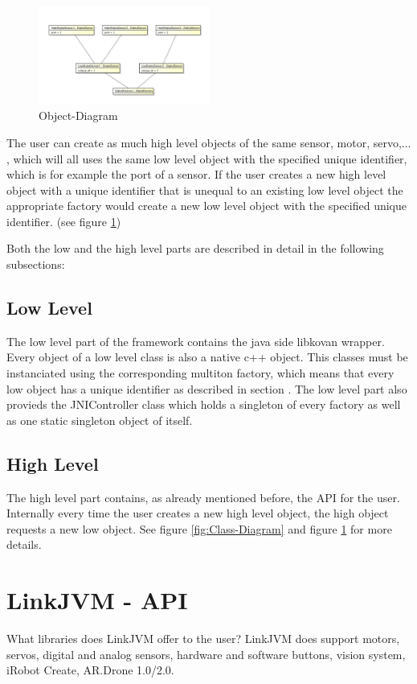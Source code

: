 \documentclass{juniorjournal}
\begin{document}
\begin{figure}[htbp]
\centering
\includegraphics[width=0.5\textwidth]{images/Object-Diagram.pdf}
\caption{Object-Diagram}
\label{fig:Object-Diagram}
\end{figure}

The user can create as much high level objects of the same sensor, motor, 
servo,... , which will all uses the same low level object with the specified 
unique identifier, which is for example the port of a sensor. If the user 
creates a new high level object with a unique identifier that is unequal to 
an existing low level object the appropriate factory would 
create a new low level object with the specified unique identifier. (see figure \ref{fig:Object-Diagram})

Both the low and the high level parts are described in detail in the following subsections:

\subsection{Low Level}
The low level part of the framework contains the java side libkovan wrapper. 
Every object of a low level class is also a native c++ object.
This classes must be instanciated using the corresponding multiton factory, which means that every low object has a unique identifier as described in section .
The low level part also provieds the JNIController class which holds a singleton of every factory as well as one static singleton object of itself.

\subsection{High Level}
The high level part contains, as already mentioned before, the API for the user. 
Internally every time the user creates a new high level object, the high object requests a new low object.
See figure \ref{fig:Class-Diagram} and figure \ref{fig:Object-Diagram} for more details.

\section{LinkJVM - API}
What libraries does LinkJVM offer to the user?
LinkJVM does support motors, servos, digital and analog sensors, hardware and 
software buttons, vision system, iRobot Create, AR.Drone 1.0/2.0.
\end{document}

